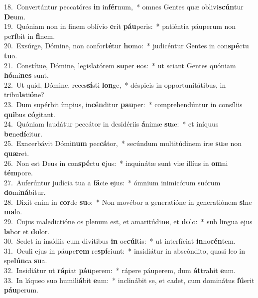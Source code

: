 {18.~}Convertántur peccatóres \textbf{in} in\textbf{fér}num,~* omnes Gentes quæ oblivi\textbf{scún}tur \textbf{De}um.\\
{19.~}Quóniam non in finem oblívio \textbf{e}rit \textbf{páu}peris:~* patiéntia páuperum non pe\textbf{rí}bit in \textbf{fi}nem.\\
{20.~}Exsúrge, Dómine, non confor\textbf{té}tur \textbf{ho}mo:~* judicéntur Gentes in con\textbf{spé}ctu \textbf{tu}o.\\
{21.~}Constítue, Dómine, legislatórem \textbf{su}per \textbf{e}os:~* ut sciant Gentes quóniam \textbf{hó}mi\textbf{nes} sunt.\\
{22.~}Ut quid, Dómine, reces\textbf{sí}sti \textbf{lon}ge,~* déspicis in opportunitátibus, in tribu\textbf{la}ti\textbf{ó}ne?\\
{23.~}Dum supérbit ímpius, in\textbf{cén}ditur \textbf{pau}per:~* comprehendúntur in consíliis \textbf{qui}bus \textbf{có}gitant.\\
{24.~}Quóniam laudátur peccátor in desidériis \textbf{á}nimæ \textbf{su}æ:~* et iníquus \textbf{be}ne\textbf{dí}citur.\\
{25.~}Exacerbávit Dómi\textbf{num} pec\textbf{cá}tor,~* secúndum multitúdinem iræ \textbf{su}æ non \textbf{quæ}ret.\\
{26.~}Non est Deus in con\textbf{spé}ctu \textbf{e}jus:~* inquinátæ sunt viæ illíus in \textbf{om}ni \textbf{tém}pore.\\
{27.~}Auferúntur judícia tua a \textbf{fá}cie \textbf{e}jus:~* ómnium inimicórum suórum \textbf{do}mi\textbf{ná}bitur.\\
{28.~}Dixit enim in \textbf{cor}de \textbf{su}o:~* Non movébor a generatióne in generatiónem \textbf{si}ne \textbf{ma}lo.\\
{29.~}Cujus maledictióne os plenum est, et amaritúdi\textbf{ne}, et \textbf{do}lo:~* sub lingua ejus \textbf{la}bor et \textbf{do}lor.\\
{30.~}Sedet in insídiis cum divítibus \textbf{in} oc\textbf{cúl}tis:~* ut interfíciat \textbf{in}no\textbf{cén}tem.\\
{31.~}Oculi ejus in páupe\textbf{rem} re\textbf{spí}ciunt:~* insidiátur in abscóndito, quasi leo in spe\textbf{lún}ca \textbf{su}a.\\
{32.~}Insidiátur ut \textbf{rá}piat \textbf{páu}perem:~* rápere páuperem, dum \textbf{át}trahit \textbf{e}um.\\
{33.~}In láqueo suo humili\textbf{á}bit \textbf{e}um:~* inclinábit se, et cadet, cum dominátus \textbf{fú}erit \textbf{páu}perum.\\

